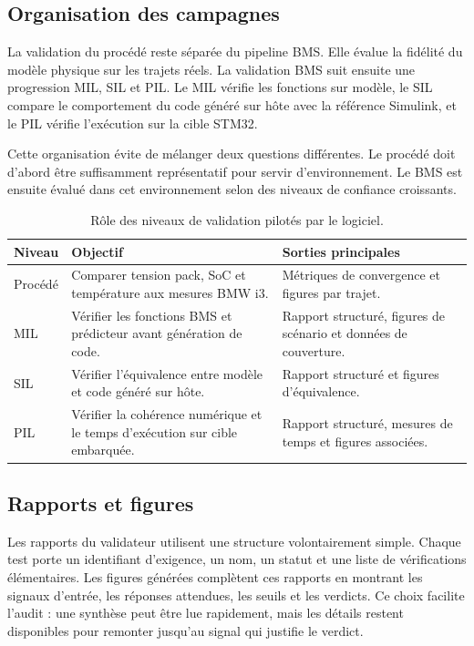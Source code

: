 \subsection{Organisation des campagnes}
\label{subsec:ch5_campagnes}

La validation du procédé reste séparée du pipeline BMS. Elle évalue la fidélité du modèle physique sur les trajets réels. La validation BMS suit ensuite une progression MIL, SIL et PIL. Le MIL vérifie les fonctions sur modèle, le SIL compare le comportement du code généré sur hôte avec la référence Simulink, et le PIL vérifie l'exécution sur la cible STM32.

\noindent
Cette organisation évite de mélanger deux questions différentes. Le procédé doit d'abord être suffisamment représentatif pour servir d'environnement. Le BMS est ensuite évalué dans cet environnement selon des niveaux de confiance croissants.

\begin{table}[H]
  \centering
  \small
  \begin{tabularx}{\textwidth}{|l|X|X|}
    \hline
    \textbf{Niveau} & \textbf{Objectif} & \textbf{Sorties principales} \\
    \hline
    Procédé & Comparer tension pack, SoC et température aux mesures BMW i3. & Métriques de convergence et figures par trajet. \\
    \hline
    MIL & Vérifier les fonctions BMS et prédicteur avant génération de code. & Rapport structuré, figures de scénario et données de couverture. \\
    \hline
    SIL & Vérifier l'équivalence entre modèle et code généré sur hôte. & Rapport structuré et figures d'équivalence. \\
    \hline
    PIL & Vérifier la cohérence numérique et le temps d'exécution sur cible embarquée. & Rapport structuré, mesures de temps et figures associées. \\
    \hline
  \end{tabularx}
  \captionsetup{width=0.9\textwidth, skip=15pt}
  \caption{Rôle des niveaux de validation pilotés par le logiciel.}
  \label{tab:ch5_niveaux_validation}
\end{table}

\subsection{Rapports et figures}
\label{subsec:ch5_rapports_validateur}

Les rapports du validateur utilisent une structure volontairement simple. Chaque test porte un identifiant d'exigence, un nom, un statut et une liste de vérifications élémentaires. Les figures générées complètent ces rapports en montrant les signaux d'entrée, les réponses attendues, les seuils et les verdicts. Ce choix facilite l'audit : une synthèse peut être lue rapidement, mais les détails restent disponibles pour remonter jusqu'au signal qui justifie le verdict.

